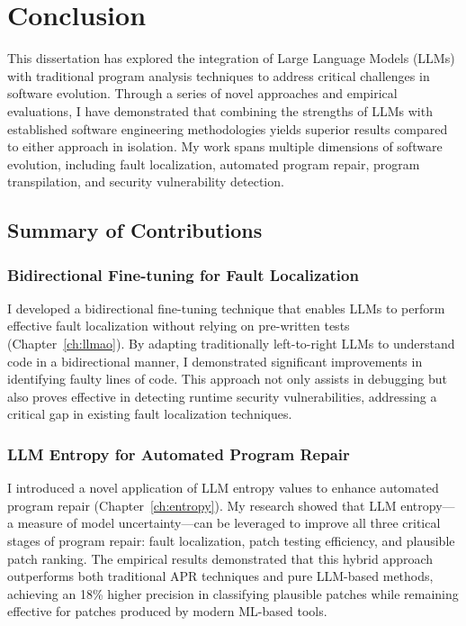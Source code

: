 \chapter{Conclusion}
\label{sec:conclusion}

This dissertation has explored the integration of Large Language Models (LLMs) with traditional program analysis techniques to address critical challenges in software evolution. Through a series of novel approaches and empirical evaluations, I have demonstrated that combining the strengths of LLMs with established software engineering methodologies yields superior results compared to either approach in isolation. My work spans multiple dimensions of software evolution, including fault localization, automated program repair, program transpilation, and security vulnerability detection.

\section{Summary of Contributions}

\subsection{Bidirectional Fine-tuning for Fault Localization}

I developed a bidirectional fine-tuning technique that enables LLMs to perform effective fault localization without relying on pre-written tests (Chapter~\ref{ch:llmao}). By adapting traditionally left-to-right LLMs to understand code in a bidirectional manner, I demonstrated significant improvements in identifying faulty lines of code. This approach not only assists in debugging but also proves effective in detecting runtime security vulnerabilities, addressing a critical gap in existing fault localization techniques.

\subsection{LLM Entropy for Automated Program Repair}

I introduced a novel application of LLM entropy values to enhance automated program repair (Chapter~\ref{ch:entropy}). My research showed that LLM entropy—a measure of model uncertainty—can be leveraged to improve all three critical stages of program repair: fault localization, patch testing efficiency, and plausible patch ranking. The empirical results demonstrated that this hybrid approach outperforms both traditional APR techniques and pure LLM-based methods, achieving an 18\% higher precision in classifying plausible patches while remaining effective for patches produced by modern ML-based tools.

